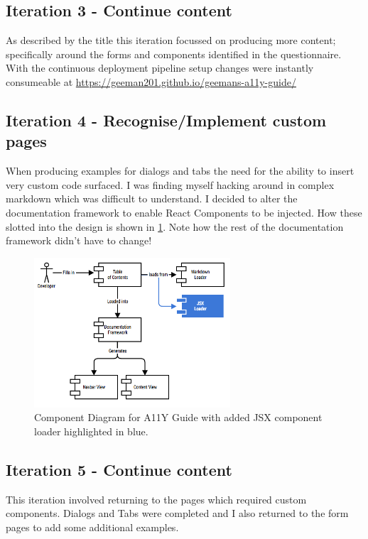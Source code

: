 \subsection{Iteration 3 - Continue content}
As described by the title this iteration focussed on producing more content;
specifically around the forms and components identified in the questionnaire.
With the continuous deployment pipeline setup changes were instantly
consumeable at \url{https://geeman201.github.io/geemans-a11y-guide/}

\subsection{Iteration 4 - Recognise/Implement custom pages}
\label{sec:iteration_4}
When producing examples for dialogs and tabs the
need for the ability to insert very custom code surfaced. I was finding myself
hacking around in complex markdown which was difficult to understand. I decided
to alter the documentation framework to enable React Components to be injected.
How these slotted into the design is
shown in \ref{fig:allycomponent_2}. Note how the rest of the documentation
framework didn't have to change!

\begin{figure}[H]
\centering
\includegraphics[width=0.65\textwidth]{figures/documentation_design_2}
\captionsetup{justification=centering}
\caption{Component Diagram for A11Y Guide with added JSX
component loader highlighted in blue.
\label{fig:allycomponent_2}}
\end{figure}

\subsection{Iteration 5 - Continue content}
This iteration involved returning to the pages which required custom
components. Dialogs and Tabs were completed and I also returned to the form
pages to add some additional examples.

